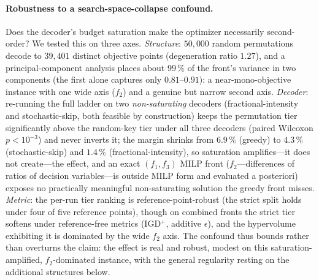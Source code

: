 \documentclass[runningheads]{llncs}
\newcommand{\IGD}{\textsf{IGD}}
\begin{document}
\paragraph{Robustness to a search-space-collapse confound.}
Does the decoder's budget saturation make the optimizer necessarily second-order? We tested this on three axes. \emph{Structure}: $50{,}000$ random permutations decode to $39{,}401$ distinct objective points (degeneration ratio $1.27$), and a principal-component analysis places about $99\,\%$ of the front's variance in two components (the first alone captures only $0.81$--$0.91$): a near-mono-objective instance with one wide axis ($f_2$) and a genuine but narrow second axis. \emph{Decoder}: re-running the full ladder on two \emph{non-saturating} decoders (fractional-intensity and stochastic-skip, both feasible by construction) keeps the permutation tier significantly above the random-key tier under all three decoders (paired Wilcoxon $p<10^{-3}$) and never inverts it; the margin shrinks from $6.9\,\%$ (greedy) to $4.3\,\%$ (stochastic-skip) and $1.4\,\%$ (fractional-intensity), so saturation amplifies---it does not create---the effect, and an exact $(f_1,f_3)$ MILP front ($f_2$---differences of ratios of decision variables---is outside MILP form and evaluated a posteriori) exposes no practically meaningful non-saturating solution the greedy front misses. \emph{Metric}: the per-run tier ranking is reference-point-robust (the strict split holds under four of five reference points), though on combined fronts the strict tier softens under reference-free metrics (\IGD$^{+}$, additive $\epsilon$), and the hypervolume exhibiting it is dominated by the wide $f_2$ axis. The confound thus bounds rather than overturns the claim: the effect is real and robust, modest on this saturation-amplified, $f_2$-dominated instance, with the general regularity resting on the additional structures below.
\end{document}
